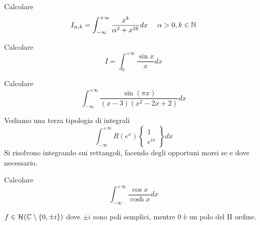 \begin{figure}[htpb]
\end{figure}
\FloatBarrier
Calcolare
\begin{equation*}
I_{\alpha ,k} = \int ^{ + \infty }_{ - \infty }\frac{x^{k}}{\alpha ^{2} + x^{2k}} dx\ \ \ \ \alpha  > 0,k\in \NN 
\end{equation*}
\Esercizio{}

Calcolare
\begin{equation*}
I = \int ^{ + \infty }_{0}\frac{\sin x}{x} dx
\end{equation*}
\Esercizio{}

Calcolare
\begin{equation*}
\int ^{ + \infty }_{ - \infty }\frac{\sin\left(\pi x\right)}{\left(x - 3\right)\left(x^{2} - 2x + 2\right)} dx
\end{equation*}
\Esercizio{}

Vediamo una terza tipologia di integrali
\begin{equation*}
\boxed{\int ^{ + \infty }_{ - \infty } R\left(e^{x}\right)\left\{\begin{array}{ c }
1\\
e^{ix}
\end{array}\right\} dx}
\end{equation*}
Si risolvono integrando sui rettangoli, facendo degli opportuni morsi se e dove necessario.

Calcolare
\begin{equation*}
\int ^{ + \infty }_{ - \infty }\frac{\cos x}{\cosh x} dx
\end{equation*}
\ParteSoluzioni
\Soluzione

$f\in \mathcal{H} (\mathbb{C}  \setminus \{0,\pm i\})$ dove $\pm i$ sono poli semplici, mentre $0$ è un polo del II ordine. 



